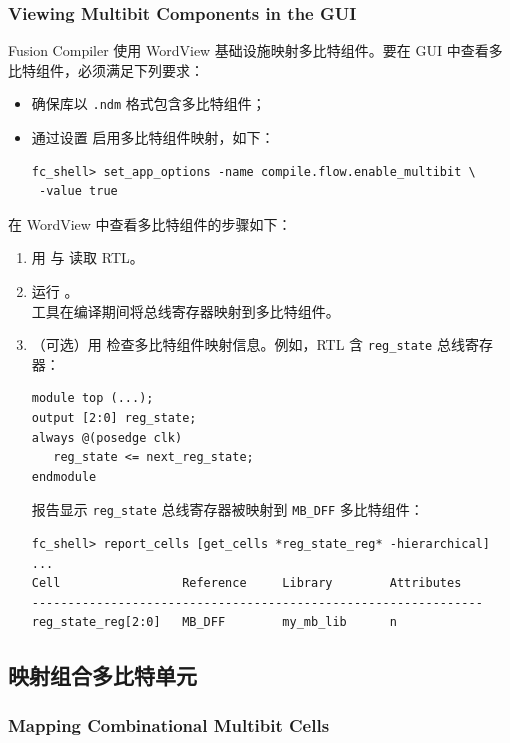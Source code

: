 \subsubsection*{Viewing Multibit Components in the GUI}

Fusion Compiler 使用 WordView 基础设施映射多比特组件。要在 GUI 中查看多比特组件，必须满足下列要求：
\begin{itemize}
  \item 确保库以 \texttt{.ndm} 格式包含多比特组件；
  \item 通过设置  启用多比特组件映射，如下：
\begin{lstlisting}
fc_shell> set_app_options -name compile.flow.enable_multibit \
 -value true
\end{lstlisting}
\end{itemize}

在 WordView 中查看多比特组件的步骤如下：
\begin{enumerate}
  \item 用  与  读取 RTL。
  \item 运行 。\\
    工具在编译期间将总线寄存器映射到多比特组件。
  \item （可选）用  检查多比特组件映射信息。例如，RTL 含 \texttt{reg\_state} 总线寄存器：
\begin{lstlisting}
module top (...);
output [2:0] reg_state;
always @(posedge clk)
   reg_state <= next_reg_state;
endmodule
\end{lstlisting}
    报告显示 \texttt{reg\_state} 总线寄存器被映射到 \texttt{MB\_DFF} 多比特组件：
\begin{lstlisting}
fc_shell> report_cells [get_cells *reg_state_reg* -hierarchical]
...
Cell                 Reference     Library        Attributes
---------------------------------------------------------------
reg_state_reg[2:0]   MB_DFF        my_mb_lib      n
\end{lstlisting}
\end{enumerate}

\subsection{映射组合多比特单元}
\subsubsection*{Mapping Combinational Multibit Cells}

